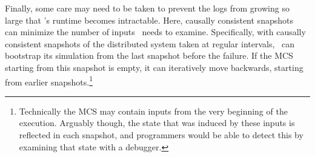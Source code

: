 Finally, some care may need to be taken to prevent the logs from growing so large that
\simulator's runtime becomes intractable. Here, causally consistent
snapshots~\cite{Chandy:1985:DSD:214451.214456} can minimize the number of inputs \simulator~needs
to examine. Specifically, with causally consistent snapshots of the distributed
system taken at regular intervals, \simulator~can bootstrap its simulation from the last snapshot before the failure.
If the MCS starting from this snapshot is empty, it can iteratively move backwards, starting from earlier
snapshots.\footnote{Technically the MCS may contain inputs from the very beginning of the execution. Arguably though,
the state that was induced by these inputs is reflected in each snapshot, and programmers would be able to detect
this by examining that state with a debugger.}


